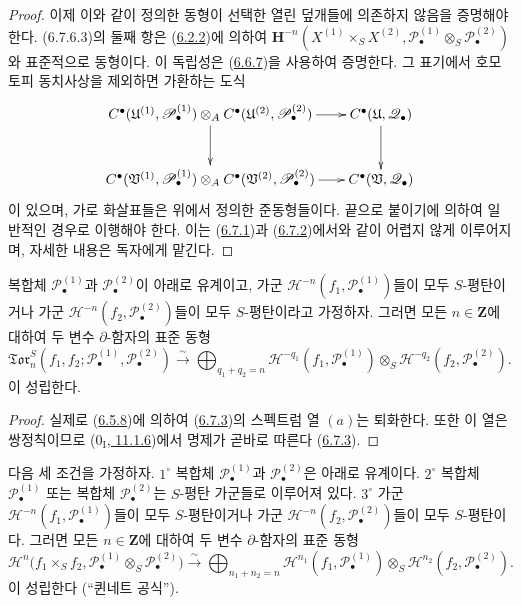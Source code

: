 \begin{proof}
이제 이와 같이 정의한 동형이 선택한 열린 덮개들에 의존하지 않음을
증명해야 한다. (6.7.6.3)의 둘째 항은
(\hyperref[III.6.2.2-fr]{6.2.2})에 의하여
$\mathbf H^{-n}
(X^{(1)}\times_S X^{(2)},
 \mathscr P_\bullet^{(1)}\otimes_S\mathscr P_\bullet^{(2)})$와
표준적으로 동형이다. 이 독립성은
(\hyperref[III.6.6.7-fr]{6.6.7})을 사용하여 증명한다.
그 표기에서 호모토피 동치사상을 제외하면 가환하는 도식
\[
\xymatrix@C=18pt@R=28pt{
  C^\bullet(\mathfrak U^{(1)},\mathscr P_\bullet^{(1)})
  \otimes_A
  C^\bullet(\mathfrak U^{(2)},\mathscr P_\bullet^{(2)})
  \ar[r]\ar[d]
  & C^\bullet(\mathfrak U,\mathscr Q_\bullet)\ar[d]
  \\
  C^\bullet(\mathfrak V^{(1)},\mathscr P_\bullet^{(1)})
  \otimes_A
  C^\bullet(\mathfrak V^{(2)},\mathscr P_\bullet^{(2)})
  \ar[r]
  & C^\bullet(\mathfrak V,\mathscr Q_\bullet)
}
\]
이 있으며, 가로 화살표들은 위에서 정의한 준동형들이다. 끝으로
붙이기에 의하여 일반적인 경우로 이행해야 한다. 이는
(\hyperref[III.6.7.1-fr]{6.7.1})과
(\hyperref[III.6.7.2-fr]{6.7.2})에서와 같이 어렵지 않게 이루어지며,
자세한 내용은 독자에게 맡긴다.
\end{proof}

\begin{proposition}[6.7.7]
\label{III.6.7.7-fr}
복합체 $\mathscr P_\bullet^{(1)}$과
$\mathscr P_\bullet^{(2)}$이 아래로 유계이고, 가군
$\mathscr H^{-n}(f_1,\mathscr P_\bullet^{(1)})$들이 모두
$S$-평탄이거나 가군
$\mathscr H^{-n}(f_2,\mathscr P_\bullet^{(2)})$들이 모두
$S$-평탄이라고 가정하자. 그러면 모든 $n\in\mathbf Z$에 대하여
두 변수 $\partial$-함자의 표준 동형
\[
  \mathfrak{Tor}_n^S
  (f_1,f_2;\mathscr P_\bullet^{(1)},\mathscr P_\bullet^{(2)})
  \xrightarrow{\sim}
  \bigoplus_{q_1+q_2=n}
  \mathscr H^{-q_1}(f_1,\mathscr P_\bullet^{(1)})
  \otimes_S
  \mathscr H^{-q_2}(f_2,\mathscr P_\bullet^{(2)}).
  \tag{6.7.7.1}\label{III.6.7.7.1.fr}
\]
이 성립한다.
\end{proposition}

\begin{proof}
실제로 (\hyperref[III.6.5.8-fr]{6.5.8})에 의하여
(\hyperref[III.6.7.3-fr]{6.7.3})의 스펙트럼 열 $(a)$는 퇴화한다.
또한 이 열은 쌍정칙이므로
(\hyperref[0.11.1.6-fr]{$0_{\mathrm I}$, 11.1.6})에서 명제가 곧바로
따른다 (\hyperref[III.6.7.3-fr]{6.7.3}).
\end{proof}

\begin{theorem}[6.7.8]
\label{III.6.7.8-fr}
다음 세 조건을 가정하자.
$1^\circ$ 복합체 $\mathscr P_\bullet^{(1)}$과
$\mathscr P_\bullet^{(2)}$은 아래로 유계이다.
$2^\circ$ 복합체 $\mathscr P_\bullet^{(1)}$ 또는 복합체
$\mathscr P_\bullet^{(2)}$는 $S$-평탄 가군들로 이루어져 있다.
$3^\circ$
가군 $\mathscr H^{-n}(f_1,\mathscr P_\bullet^{(1)})$들이 모두
$S$-평탄이거나 가군
$\mathscr H^{-n}(f_2,\mathscr P_\bullet^{(2)})$들이 모두
$S$-평탄이다. 그러면 모든 $n\in\mathbf Z$에 대하여 두 변수
$\partial$-함자의 표준 동형
\[
  \mathscr H^n\bigl(f_1\times_S f_2,
    \mathscr P_\bullet^{(1)}\otimes_S\mathscr P_\bullet^{(2)}\bigr)
  \xrightarrow{\sim}
  \bigoplus_{n_1+n_2=n}
  \mathscr H^{n_1}(f_1,\mathscr P_\bullet^{(1)})
  \otimes_S
  \mathscr H^{n_2}(f_2,\mathscr P_\bullet^{(2)}).
  \tag{6.7.8.1}\label{III.6.7.8.1.fr}
\]
이 성립한다 (``퀸네트 공식'').
\end{theorem}

